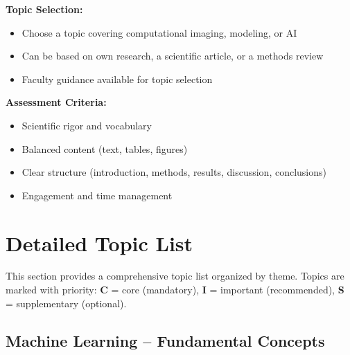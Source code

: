 \documentclass[11pt,a4paper]{article}
\begin{document}
\textbf{Topic Selection:}
\begin{itemize}[nosep]
    \item Choose a topic covering computational imaging, modeling, or AI
    \item Can be based on own research, a scientific article, or a methods review
    \item Faculty guidance available for topic selection
\end{itemize}

\textbf{Assessment Criteria:}
\begin{itemize}[nosep]
    \item Scientific rigor and vocabulary
    \item Balanced content (text, tables, figures)
    \item Clear structure (introduction, methods, results, discussion, conclusions)
    \item Engagement and time management
\end{itemize}

\section{Detailed Topic List}

This section provides a comprehensive topic list organized by theme. Topics are marked with priority: \textbf{C} = core (mandatory), \textbf{I} = important (recommended), \textbf{S} = supplementary (optional).

\subsection{Machine Learning -- Fundamental Concepts}
\end{document}

